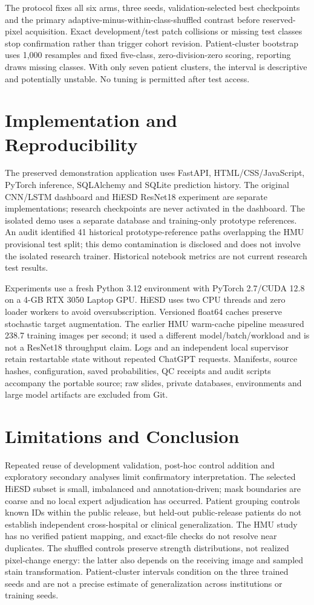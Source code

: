 \documentclass[conference]{IEEEtran}
\begin{document}
The protocol fixes all six arms, three seeds, validation-selected best checkpoints and the primary adaptive-minus-within-class-shuffled contrast before reserved-pixel acquisition. Exact development/test patch collisions or missing test classes stop confirmation rather than trigger cohort revision. Patient-cluster bootstrap uses 1,000 resamples and fixed five-class, zero-division-zero scoring, reporting draws missing classes. With only seven patient clusters, the interval is descriptive and potentially unstable. No tuning is permitted after test access.

\section{Implementation and Reproducibility}
The preserved demonstration application uses FastAPI, HTML/CSS/JavaScript, PyTorch inference, SQLAlchemy and SQLite prediction history. The original CNN/LSTM dashboard and HiESD ResNet18 experiment are separate implementations; research checkpoints are never activated in the dashboard. The isolated demo uses a separate database and training-only prototype references. An audit identified 41 historical prototype-reference paths overlapping the HMU provisional test split; this demo contamination is disclosed and does not involve the isolated research trainer. Historical notebook metrics are not current research test results.

Experiments use a fresh Python 3.12 environment with PyTorch 2.7/CUDA 12.8 on a 4-GB RTX 3050 Laptop GPU. HiESD uses two CPU threads and zero loader workers to avoid oversubscription. Versioned float64 caches preserve stochastic target augmentation. The earlier HMU warm-cache pipeline measured 238.7 training images per second; it used a different model/batch/workload and is not a ResNet18 throughput claim. Logs and an independent local supervisor retain restartable state without repeated ChatGPT requests. Manifests, source hashes, configuration, saved probabilities, QC receipts and audit scripts accompany the portable source; raw slides, private databases, environments and large model artifacts are excluded from Git.

\section{Limitations and Conclusion}
Repeated reuse of development validation, post-hoc control addition and exploratory secondary analyses limit confirmatory interpretation. The selected HiESD subset is small, imbalanced and annotation-driven; mask boundaries are coarse and no local expert adjudication has occurred. Patient grouping controls known IDs within the public release, but held-out public-release patients do not establish independent cross-hospital or clinical generalization. The HMU study has no verified patient mapping, and exact-file checks do not resolve near duplicates.
The shuffled controls preserve strength distributions, not realized pixel-change energy: the latter also depends on the receiving image and sampled stain transformation. Patient-cluster intervals condition on the three trained seeds and are not a precise estimate of generalization across institutions or training seeds.
\end{document}

